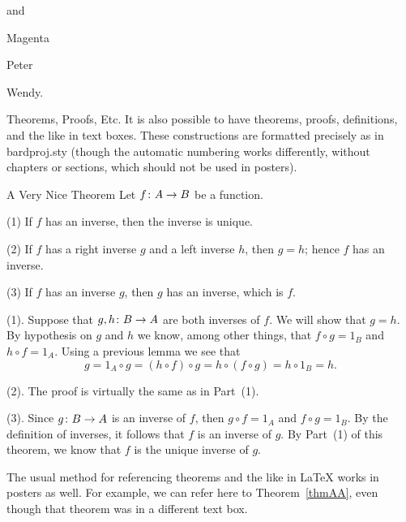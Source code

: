 \documentclass[12pt]{article}
\begin{document}
\begin{posterbard}
\begin{posterboxnotitle}
and

\begin{itemizec}{Magenta}
\item Peter
\item Wendy.
\end{itemizec}
\end{posterboxnotitle}


\begin{posterboxtitle}{Theorems, Proofs, Etc.}
It is also possible to have theorems, proofs, definitions, and the like in text boxes.  These constructions are formatted precisely as in bardproj.sty (though the automatic numbering works differently, without chapters or sections, which should not be used in posters).
\end{posterboxtitle}


\begin{posterboxtitle}{A Very Nice Theorem}
\thm\label{thmAA} 
Let ${f} \colon {A} \to {B}$ be a function.
%
\enum 
\item[(1)] If $f$ has an inverse, then the inverse is unique.
%
\item[(2)] If $f$ has a right inverse $g$ and a left inverse $h$, then $g = h$; hence $f$ has an inverse.
%
\item[(3)] If $f$ has an inverse $g$, then $g$ has an inverse, which is $f$.
\eenum
\ethm
 
\demo
(1). Suppose that ${g, h} \colon {B} \to {A}$ are both inverses of $f$.  We will show that $g = h$.  By hypothesis on $g$ and $h$ we know, among other things, that $f \circ g = 1_B$ and $h \circ f = 1_A$.  Using a previous lemma we see that
%
\[
g  =  1_A \circ g  =  (h \circ f) \circ g  =  h \circ (f \circ g)  =  h \circ 1_B  =  h.
\]

\noindent (2). The proof is virtually the same as in Part~(1).  
\spce

\noindent (3).  Since ${g} \colon {B} \to {A}$ is an inverse of $f$, then $g \circ f = 1_A$ and $f \circ g = 1_B$.  By the definition of inverses, it follows that $f$ is an inverse of $g$.  By Part~(1) of this theorem, we know that $f$ is the unique inverse of $g$.
\edemo
\end{posterboxtitle}


\begin{posterboxnotitle}
The usual method for referencing theorems and the like in LaTeX works in posters as well.  For example, we can refer here to Theorem~\ref{thmAA}, even though that theorem was in a different text box.
\end{posterboxnotitle}



\end{posterbard}
\end{document}
